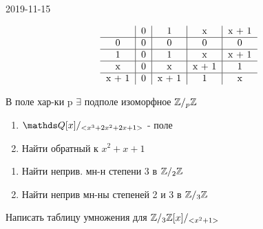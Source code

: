 \documentclass[main.tex]{subfiles}
\begin{document}
\begin{lect}{2019-11-15}
\begin{task}[2]
        \[\begin{tabular}{c|c|c|c|c}
            & 0 & 1 & x & x + 1\\\hline
            0& 0 & 0 & 0 & 0\\ \hline
            1 & 0 & 1 & x & x + 1\\ \hline
            x & 0 & x & x + 1 & 1\\ \hline
            x + 1 & 0 & x + 1 & 1 & x
        \end{tabular}\]
    \end{task}

    \begin{task}[3]
        В поле хар-ки p $\exists $ подполе изоморфное $\mathbb{Z}/_p\mathbb{Z}$
    \end{task}

    \begin{task}[4]
        \begin{enumerate}
            \item $\Q[x]/_{<x^3 + 2x^2 + 2x + 1>} $ - поле
            \item Найти обратный к $x^2 + x + 1$
        \end{enumerate}
    \end{task}

    \begin{task}[5]
        \begin{enumerate}
            \item Найти неприв. мн-н степени 3 в $\mathbb{Z}/_{2}\mathbb{Z} $
            \item Найти неприв мн-ны степеней 2 и 3 в $\mathbb{Z}/_3\mathbb{Z}$
        \end{enumerate}
    \end{task}

    \begin{task}[6]
        Написать таблицу умножения для $\mathbb{Z}/_3\mathbb{Z}[x]/_{<x^2 +1 >} $
    \end{task}
\end{lect} 
\end{document}
